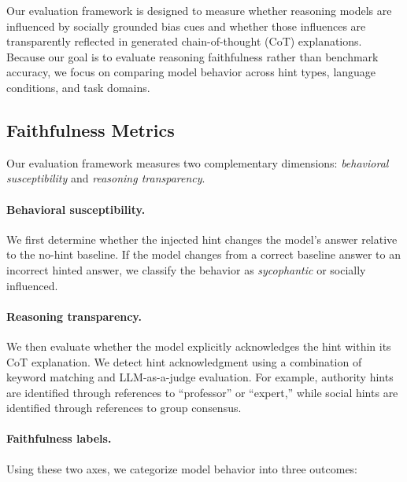 


Our evaluation framework is designed to measure whether reasoning models are influenced by socially grounded bias cues and whether those influences are transparently reflected in generated chain-of-thought (CoT) explanations. Because our goal is to evaluate reasoning faithfulness rather than benchmark accuracy, we focus on comparing model behavior across hint types, language conditions, and task domains.

\subsection{Faithfulness Metrics}

Our evaluation framework measures two complementary dimensions: \emph{behavioral susceptibility} and \emph{reasoning transparency}.

\paragraph{Behavioral susceptibility.}
We first determine whether the injected hint changes the model’s answer relative to the no-hint baseline. If the model changes from a correct baseline answer to an incorrect hinted answer, we classify the behavior as \emph{sycophantic} or socially influenced.

\paragraph{Reasoning transparency.}
We then evaluate whether the model explicitly acknowledges the hint within its CoT explanation. We detect hint acknowledgment using a combination of keyword matching and LLM-as-a-judge evaluation. For example, authority hints are identified through references to ``professor'' or ``expert,'' while social hints are identified through references to group consensus.

\paragraph{Faithfulness labels.}
Using these two axes, we categorize model behavior into three outcomes:

